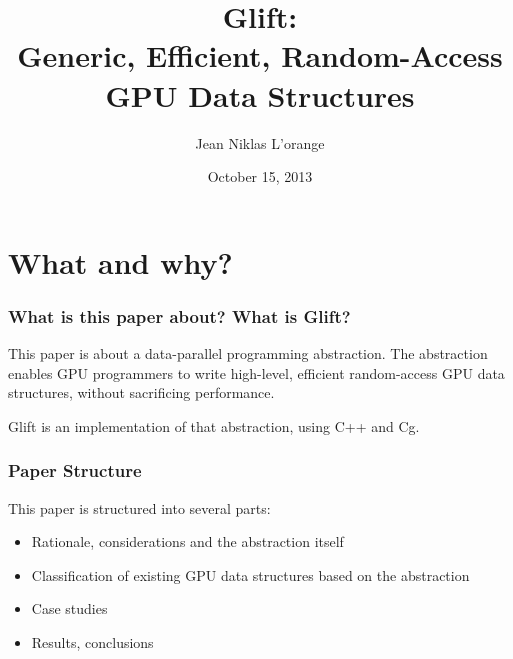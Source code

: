 \documentclass[xcolor={usenames,dvipsnames}]{beamer}
\title[Glift: Generic, Efficient, Random-Access GPU Data Structures]%
      {Glift:\\ Generic, Efficient, Random-Access GPU Data Structures}
\author{Jean Niklas L'orange}
\institute{\texttt{jeannikl@hypirion.com}}
\date{October 15, 2013}
\begin{document}
\begin{frame}
  \titlepage
\end{frame}

\section{What and why?}
\begin{frame}
  \frametitle{What is this paper about? What is Glift?}

  This paper is about a data-parallel programming abstraction. The abstraction
  enables GPU programmers to write high-level, efficient random-access GPU data
  structures, without sacrificing performance.

  \vfill \pause

  Glift is an implementation of that abstraction, using C++ and Cg.
\end{frame}

\begin{frame}
  \frametitle{Paper Structure}

  This paper is structured into several parts:
  \begin{itemize}
  \item<2-> Rationale, considerations and the abstraction itself
  \item<3-> Classification of existing GPU data structures based on the
    abstraction
  \item<4-> Case studies
  \item<5-> Results, conclusions
  \end{itemize}
\end{frame}
\end{document}
